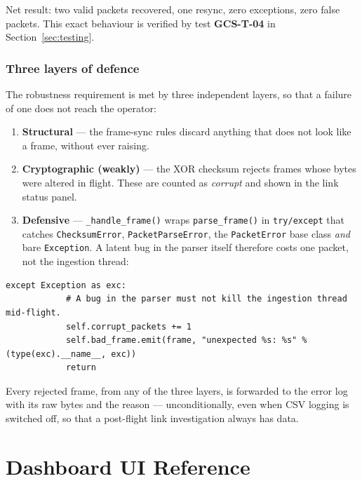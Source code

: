\documentclass[11pt,a4paper]{article}
\newcommand{\file}[1]{\texttt{#1}}
\newcommand{\code}[1]{\texttt{#1}}
\begin{document}
Net result: two valid packets recovered, one resync, zero exceptions, zero
false packets. This exact behaviour is verified by test \textbf{GCS-T-04} in
Section~\ref{sec:testing}.

\subsubsection{Three layers of defence}

The robustness requirement is met by three independent layers, so that a
failure of one does not reach the operator:

\begin{enumerate}
  \item \textbf{Structural} --- the frame-sync rules discard anything that
        does not look like a frame, without ever raising.
  \item \textbf{Cryptographic (weakly)} --- the XOR checksum rejects frames
        whose bytes were altered in flight. These are counted as
        \emph{corrupt} and shown in the link status panel.
  \item \textbf{Defensive} --- \code{\_handle\_frame()} wraps
        \code{parse\_frame()} in \code{try/except} that catches
        \code{ChecksumError}, \code{PacketParseError}, the \code{PacketError}
        base class \emph{and} bare \code{Exception}. A latent bug in the
        parser itself therefore costs one packet, not the ingestion thread:
\end{enumerate}

\begin{lstlisting}[caption={Catch-all in the ingestion path, from \file{serial\_worker.py}.},label={lst:catchall}]
        except Exception as exc:
            # A bug in the parser must not kill the ingestion thread mid-flight.
            self.corrupt_packets += 1
            self.bad_frame.emit(frame, "unexpected %s: %s" % (type(exc).__name__, exc))
            return
\end{lstlisting}

Every rejected frame, from any of the three layers, is forwarded to the error
log with its raw bytes and the reason --- unconditionally, even when CSV
logging is switched off, so that a post-flight link investigation always has
data.

\section{Dashboard UI Reference}
\label{sec:ui}
\end{document}
